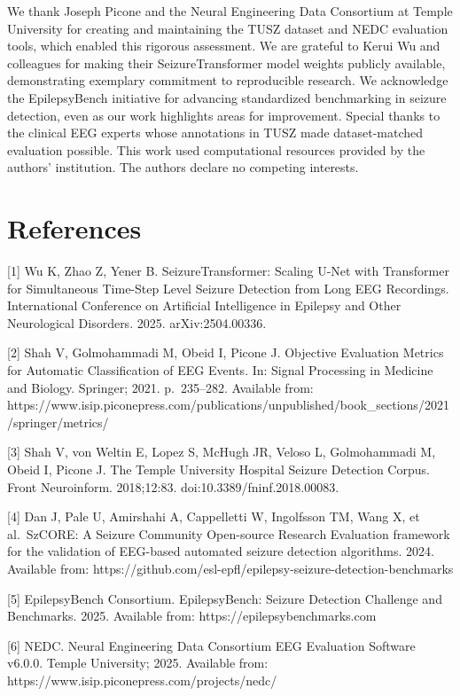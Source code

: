 \documentclass[
  10pt,
]{article}
\begin{document}
We thank Joseph Picone and the Neural Engineering Data Consortium at
Temple University for creating and maintaining the TUSZ dataset and NEDC
evaluation tools, which enabled this rigorous assessment. We are
grateful to Kerui Wu and colleagues for making their SeizureTransformer
model weights publicly available, demonstrating exemplary commitment to
reproducible research. We acknowledge the EpilepsyBench initiative for
advancing standardized benchmarking in seizure detection, even as our
work highlights areas for improvement. Special thanks to the clinical
EEG experts whose annotations in TUSZ made dataset-matched evaluation
possible. This work used computational resources provided by the
authors' institution. The authors declare no competing interests.



\hypertarget{references}{%
\section{References}\label{references}}

{[}1{]} Wu K, Zhao Z, Yener B. SeizureTransformer: Scaling U-Net with
Transformer for Simultaneous Time-Step Level Seizure Detection from Long
EEG Recordings. International Conference on Artificial Intelligence in
Epilepsy and Other Neurological Disorders. 2025. arXiv:2504.00336.

{[}2{]} Shah V, Golmohammadi M, Obeid I, Picone J. Objective Evaluation
Metrics for Automatic Classification of EEG Events. In: Signal
Processing in Medicine and Biology. Springer; 2021. p.~235--282.
Available from:
https://www.isip.piconepress.com/publications/unpublished/book\_sections/2021/springer/metrics/

{[}3{]} Shah V, von Weltin E, Lopez S, McHugh JR, Veloso L, Golmohammadi
M, Obeid I, Picone J. The Temple University Hospital Seizure Detection
Corpus. Front Neuroinform. 2018;12:83. doi:10.3389/fninf.2018.00083.

{[}4{]} Dan J, Pale U, Amirshahi A, Cappelletti W, Ingolfsson TM, Wang
X, et al.~SzCORE: A Seizure Community Open-source Research Evaluation
framework for the validation of EEG-based automated seizure detection
algorithms. 2024. Available from:
https://github.com/esl-epfl/epilepsy-seizure-detection-benchmarks

{[}5{]} EpilepsyBench Consortium. EpilepsyBench: Seizure Detection
Challenge and Benchmarks. 2025. Available from:
https://epilepsybenchmarks.com

{[}6{]} NEDC. Neural Engineering Data Consortium EEG Evaluation Software
v6.0.0. Temple University; 2025. Available from:
https://www.isip.piconepress.com/projects/nedc/
\end{document}
